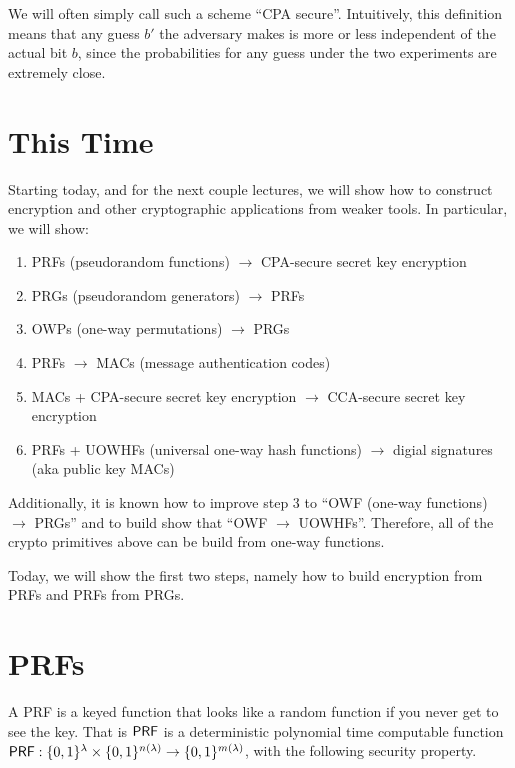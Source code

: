 We will often simply call such a scheme ``CPA secure''.  Intuitively, this definition means that any guess $b'$ the adversary makes is more or less independent of the actual bit $b$, since the probabilities for any guess under the two experiments are extremely close.


\section{This Time}

Starting today, and for the next couple lectures, we will show how to construct encryption and other cryptographic applications from weaker tools.  In particular, we will show:
\begin{enumerate}
	\item PRFs (pseudorandom functions) $\rightarrow$ CPA-secure secret key encryption
	\item PRGs (pseudorandom generators) $\rightarrow$ PRFs
	\item OWPs (one-way permutations) $\rightarrow$ PRGs
	\item PRFs $\rightarrow$ MACs (message authentication codes)
	\item MACs + CPA-secure secret key encryption $\rightarrow$ CCA-secure secret key encryption
	\item PRFs + UOWHFs (universal one-way hash functions) $\rightarrow$ digial signatures (aka public key MACs)
\end{enumerate}
Additionally, it is known how to improve step 3 to ``OWF (one-way functions) $\rightarrow$ PRGs'' and to build show that ``OWF $\rightarrow$ UOWHFs''.  Therefore, all of the crypto primitives above can be build from one-way functions.

Today, we will show the first two steps, namely how to build encryption from PRFs and PRFs from PRGs.


\section{PRFs}

A PRF is a keyed function that looks like a random function if you never get to see the key.  That is ${\sf PRF}$ is a deterministic polynomial time computable function ${\sf PRF}:\{0,1\}^\lambda\times\{0,1\}^{n(\lambda)}\rightarrow\{0,1\}^{m(\lambda)}$, with the following security property.  

